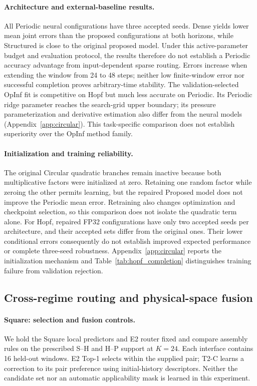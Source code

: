 \paragraph{Architecture and external-baseline results.}
All Periodic neural configurations have three accepted seeds.
Dense yields lower mean joint errors than the proposed configurations
at both horizons, while Structured is close to the original proposed
model. Under this active-parameter budget and evaluation protocol,
the results therefore do not establish a Periodic accuracy advantage
from input-dependent sparse routing. Errors increase when extending
the window from 24 to 48 steps; neither low finite-window error nor
successful completion proves arbitrary-time stability.
The validation-selected OpInf fit is competitive on Hopf but much
less accurate on Periodic. Its Periodic ridge parameter reaches the
search-grid upper boundary; its pressure parameterization and derivative
estimation also differ from the neural models
(Appendix~\ref{app:circular}). This task-specific comparison does not
establish superiority over the OpInf method family.

\paragraph{Initialization and training reliability.}
The original Circular quadratic branches remain inactive because
both multiplicative factors were initialized at zero.
Retaining one random factor while zeroing the other permits learning,
but the repaired Proposed model does not improve the Periodic mean
error. Retraining also changes optimization and checkpoint selection,
so this comparison does not isolate the quadratic term alone.
For Hopf, repaired FP32 configurations have only two accepted seeds
per architecture, and their accepted sets differ from the original
ones. Their lower conditional errors consequently do not establish
improved expected performance or complete three-seed robustness.
Appendix~\ref{app:circular} reports the initialization mechanism and
Table~\ref{tab:hopf_completion} distinguishes training failure from
validation rejection.

\subsection{Cross-regime routing and physical-space fusion}
\label{sec:exp_fusion}

\paragraph{Square: selection and fusion controls.}
We hold the Square local predictors and E2 router fixed and compare
assembly rules on the prescribed S--H and H--P support at $K=24$.
Each interface contains 16 held-out windows.
E2 Top-1 selects within the supplied pair; T2-C learns a correction
to its pair preference using initial-history descriptors.
Neither the candidate set nor an automatic applicability mask is
learned in this experiment.


